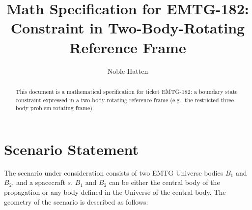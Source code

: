 \documentclass[]{article}
\title{Math Specification for EMTG-182: Constraint in Two-Body-Rotating Reference Frame}
\author{Noble Hatten}
\begin{document}
\maketitle

\begin{abstract}
	This document is a mathematical specification for ticket EMTG-182: a boundary state constraint expressed in a two-body-rotating reference frame (e.g., the restricted three-body problem rotating frame).

\end{abstract}

\tableofcontents

\printnomenclature

\section{Scenario Statement}
\label{sec:scenario_statement}

The scenario under consideration consists of two EMTG Universe bodies $B_1$ and $B_2$, and a spacecraft $s$. $B_1$ and $B_2$ can be either the central body of the propagation or any body defined in the Universe of the central body. The geometry of the scenario is described as follows:
\end{document}
